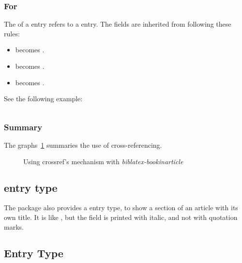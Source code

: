 \documentclass{ltxdockit}[2011/03/25]
\begin{document}
\inputminted[breaklines]{latex}{example-bookinincollection.bib}

\subsubsection{For }
The  of a  entry refers to a  entry. The fields are inherited from  following these rules:

\begin{itemize}
	\item {} becomes .
	\item {} becomes .
	\item {} becomes .

\end{itemize}

See the following example:

\inputminted[breaklines]{latex}{example-bookinthesis.bib}

\subsubsection{Summary}
The graphs~\ref{crossref} summaries the use of cross-referencing.

\begin{figure}
  \centering
\label{crossref}
\caption{Using crossref's mechanism with \emph{biblatex-bookinarticle}}
\end{figure}

\subsection{ entry type}

The package also provides a  entry type, to show a section of an article with its own title. It is like , but the  field is printed with italic, and not with quotation marks.


\subsection{ Entry Type}
\end{document}
